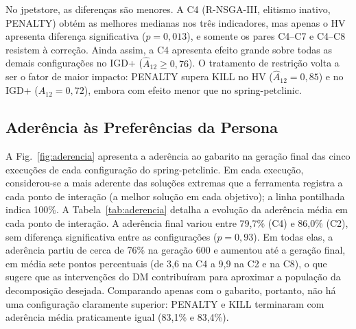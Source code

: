\documentclass[conference]{IEEEtran}
\begin{document}
No jpetstore, as diferenças são menores. A C4 (R-NSGA-III, elitismo inativo, PENALTY) obtém as melhores medianas nos três indicadores, mas apenas o HV apresenta diferença significativa ($p=0{,}013$), e somente os pares C4--C7 e C4--C8 resistem à correção. Ainda assim, a C4 apresenta efeito grande sobre todas as demais configurações no IGD+ ($\hat{A}_{12}\ge 0{,}76$). O tratamento de restrição volta a ser o fator de maior impacto: PENALTY supera KILL no HV ($\hat{A}_{12}=0{,}85$) e no IGD+ ($\hat{A}_{12}=0{,}72$), embora com efeito menor que no spring-petclinic.

\subsection{Aderência às Preferências da Persona}\label{sec:res_aderencia}

A Fig.~\ref{fig:aderencia} apresenta a aderência ao gabarito na geração final das cinco execuções de cada configuração do spring-petclinic. Em cada execução, considerou-se a mais aderente das soluções extremas que a ferramenta registra a cada ponto de interação (a melhor solução em cada objetivo); a linha pontilhada indica 100\%. A Tabela~\ref{tab:aderencia} detalha a evolução da aderência média em cada ponto de interação. A aderência final variou entre 79,7\% (C4) e 86,0\% (C2), sem diferença significativa entre as configurações ($p=0{,}93$). Em todas elas, a aderência partiu de cerca de 76\% na geração 600 e aumentou até a geração final, em média sete pontos percentuais (de 3,6 na C4 a 9,9 na C2 e na C8), o que sugere que as intervenções do DM contribuíram para aproximar a população da decomposição desejada. Comparando apenas com o gabarito, portanto, não há uma configuração claramente superior: PENALTY e KILL terminaram com aderência média praticamente igual (83,1\% e 83,4\%).
\end{document}
